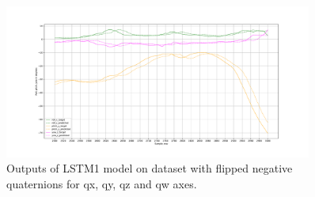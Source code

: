 \begin{figure}
	\begin{center}
		\includegraphics[width=0.9\textwidth, keepaspectratio]{gfx/lstm1_flipped-roll_pitch_yaw.pdf}
		\caption{\label{fig:flip2} Outputs of LSTM1 model on dataset with flipped negative quaternions for qx, qy, qz and qw axes.}
	\end{center}
\end{figure}